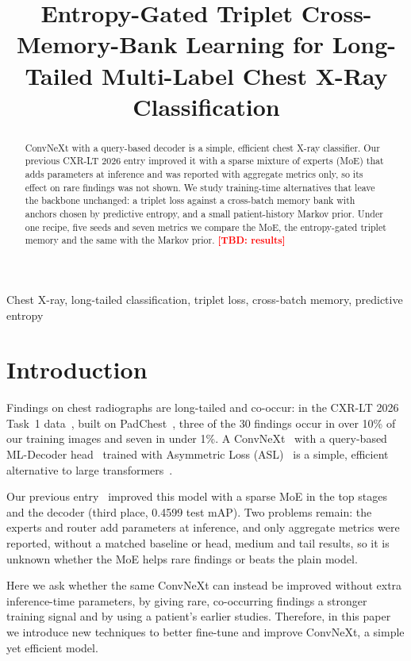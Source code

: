 \documentclass{article}
\title{Entropy-Gated Triplet Cross-Memory-Bank Learning for Long-Tailed Multi-Label Chest X-Ray Classification}
\newcommand{\TBD}[1][]{\textcolor{red}{\textbf{[TBD#1]}}}
\begin{document}
\maketitle

\begin{abstract}
ConvNeXt with a query-based decoder is a simple, efficient chest X-ray classifier. Our previous CXR-LT 2026 entry improved it with a sparse mixture of experts (MoE) that adds parameters at inference and was reported with aggregate metrics only, so its effect on rare findings was not shown. We study training-time alternatives that leave the backbone unchanged: a triplet loss against a cross-batch memory bank with anchors chosen by predictive entropy, and a small patient-history Markov prior. Under one recipe, five seeds and seven metrics we compare the MoE, the entropy-gated triplet memory and the same with the Markov prior. \TBD[: results]
\end{abstract}

\begin{keywords}
Chest X-ray, long-tailed classification, triplet loss, cross-batch memory, predictive entropy
\end{keywords}



\section{Introduction}
\label{sec:intro}
Findings on chest radiographs are long-tailed and co-occur: in the CXR-LT 2026 Task~1 data~\cite{dong2026cxrlt}, built on PadChest~\cite{bustos2020padchest}, three of the 30 findings occur in over 10\% of our training images and seven in under 1\%. A ConvNeXt~\cite{liu2022convnext} with a query-based ML-Decoder head~\cite{ridnik2021mldecoder} trained with Asymmetric Loss (ASL)~\cite{ridnik2021asl} is a simple, efficient alternative to large transformers~\cite{dosovitskiy2021vit}.

Our previous entry~\cite{pham2026efficient} improved this model with a sparse MoE in the top stages and the decoder (third place, 0.4599 test mAP). Two problems remain: the experts and router add parameters at inference, and only aggregate metrics were reported, without a matched baseline or head, medium and tail results, so it is unknown whether the MoE helps rare findings or beats the plain model.

Here we ask whether the same ConvNeXt can instead be improved without extra inference-time parameters, by giving rare, co-occurring findings a stronger training signal and by using a patient's earlier studies. Therefore, in this paper we introduce new techniques to better fine-tune and improve ConvNeXt, a simple yet efficient model.
\end{document}
